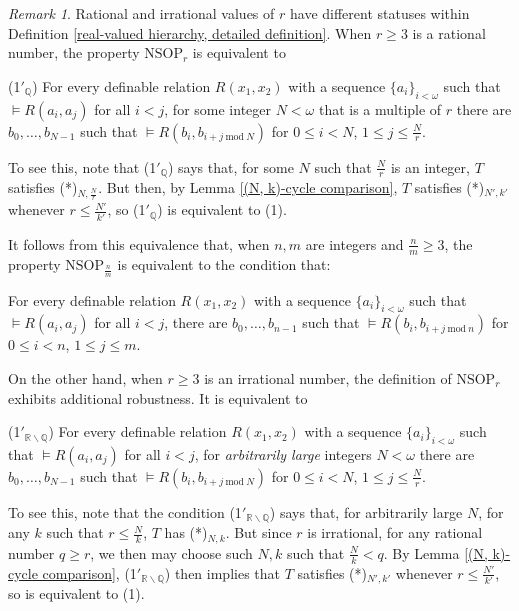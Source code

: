\documentclass{amsart}
\theoremstyle{definition}
\theoremstyle{remark}
\newtheorem{remark}[theorem]{Remark}
\numberwithin{equation}{section}
\begin{document}
\begin{remark}\label{rationals and irrationals}
    Rational and irrational values of $r$ have different statuses within Definition \ref{real-valued hierarchy, detailed definition}. When $r \geq 3$ is a rational number, the property $\mathrm{NSOP}_{r}$ is equivalent to

    (1$'_{\mathbb{Q}}$) For every definable relation $R(x_{1}, x_{2})$ with a sequence $\{a_{i}\}_{i < \omega}$ such that $\models R(a_{i}, a_{j})$ for all $i < j$, for some integer $N < \omega$ that is a multiple of $r$ there are $b_{0}, \ldots, b_{N -1} $ such that $\models R(b_{i}, b_{i+j \mathrm{\: mod \:} N})$ for $0 \leq i <N$, $1 \leq j \leq \frac{N}{r}$.





To see this, note that (1$'_{\mathbb{Q}}$) says that, for some $N$ such that $\frac{N}{r}$ is an integer, $T$ satisfies (*)$_{N, \frac{N}{r}}$. But then, by Lemma \ref{(N, k)-cycle comparison}, $T$ satisfies (*)$_{N', k'}$ whenever $r \leq \frac{N'}{k'}$, so (1$'_{\mathbb{Q}}$) is equivalent to (1).

It follows from this equivalence that, when $n, m$ are integers and $\frac{n}{m} \geq 3$, the property $\mathrm{NSOP}_{\frac{n}{m}}$ is equivalent to the condition that:

For every definable relation $R(x_{1}, x_{2})$ with a sequence $\{a_{i}\}_{i < \omega}$ such that $\models R(a_{i}, a_{j})$ for all $i < j$, there are $b_{0}, \ldots, b_{n -1} $ such that $\models R(b_{i}, b_{i+j \mathrm{\: mod \:} n})$ for $0 \leq i <n$, $1 \leq j \leq m$.

On the other hand, when $r \geq 3$ is an irrational number, the definition of $\mathrm{NSOP}_{r}$ exhibits additional robustness. It is equivalent to

(1$'_{\mathbb{R} \backslash \mathbb{Q}}$) For every definable relation $R(x_{1}, x_{2})$ with a sequence $\{a_{i}\}_{i < \omega}$ such that $\models R(a_{i}, a_{j})$ for all $i < j$, for \textit{arbitrarily large} integers $N < \omega$ there are $b_{0}, \ldots, b_{N -1} $ such that $\models R(b_{i}, b_{i+j \mathrm{\: mod \:} N})$ for $0 \leq i <N$, $1 \leq j \leq \frac{N}{r}$.

To see this, note that the condition (1$'_{\mathbb{R} \backslash \mathbb{Q}}$) says that, for arbitrarily large $N$, for any $k$ such that $r \leq \frac{N}{k}$, $T$ has (*)$_{N, k}$. But since $r$ is irrational, for any rational number $q \geq r$, we then may choose such $N, k$ such that $\frac{N}{k} < q$. By Lemma \ref{(N, k)-cycle comparison}, (1$'_{\mathbb{R} \backslash \mathbb{Q}}$) then implies that $T$ satisfies (*)$_{N', k'}$ whenever $r \leq \frac{N'}{k'}$, so is equivalent to (1).


\end{remark}
\end{document}
